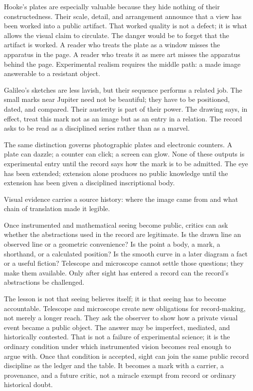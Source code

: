 Hooke's plates are especially valuable because they hide nothing of their
constructedness. Their scale, detail, and arrangement announce that a
view has been worked into a public artifact. That worked quality is not
a defect; it is what allows the visual claim to circulate. The danger
would be to forget that the artifact is worked. A reader who treats the
plate as a window misses the apparatus in the page. A reader who treats
it as mere art misses the apparatus behind the page. Experimental
realism requires the middle path: a made image answerable to a resistant
object.

Galileo's sketches are less lavish, but their sequence performs a
related job. The small marks near Jupiter need not be beautiful; they
have to be positioned, dated, and compared. Their austerity is part of
their power. The drawing says, in effect, treat this mark not as an image
but as an entry in a relation. The record asks to be read as a
disciplined series rather than as a marvel.

The same distinction governs photographic plates and electronic counters. A plate can dazzle; a counter can click; a
screen can glow. None of these outputs is experimental entry until the
record says how the mark is to be admitted. The eye has been extended;
extension alone produces no public knowledge until the extension has
been given a disciplined inscriptional body.

Visual evidence carries a source history: where the image came from and
what chain of translation made it legible.

Once instrumented and mathematical seeing become public, critics can ask
whether the abstractions used in the record are legitimate. Is the drawn
line an observed line or a geometric convenience? Is the point a body, a
mark, a shorthand, or a calculated position? Is the smooth curve in a
later diagram a fact or a useful fiction? Telescope and microscope
cannot settle those questions; they make them available. Only after
sight has entered a record can the record's abstractions be challenged.

The lesson is not that seeing believes itself; it is that seeing has to
become accountable. Telescope and microscope create new obligations for
record-making, not merely a longer reach. They ask the observer to show
how a private visual event became a public object. The answer may be
imperfect, mediated, and historically contested. That is not a failure
of experimental science; it is the ordinary condition under which
instrumented vision becomes real enough to argue with. Once that
condition is accepted, sight can join the same public record discipline as the
ledger and the table. It becomes a mark with a carrier, a provenance,
and a future critic, not a miracle exempt from record or ordinary
historical doubt.

